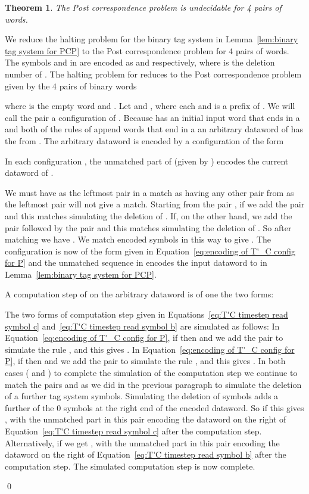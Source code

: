\documentclass[11pt]{article} \usepackage{amsfonts,amsmath,amssymb,amsthm}
\renewenvironment{proof}{{\bfseries\noindent Proof.}}{\qed\vspace{3.5ex}}
\newtheorem{theorem}{Theorem}
\begin{document}
\begin{theorem}\label{thm:PCP 4 is undecidable}
The Post correspondence problem is undecidable for 4 pairs of words. 
\end{theorem}
\begin{proof}
We reduce the halting problem for the binary tag system  in Lemma~\ref{lem:binary tag system for PCP} to the Post correspondence problem for 4 pairs of words. 
The symbols  and  in  are encoded as  and  respectively, where  is the deletion number of . 
The halting problem for  reduces to the Post correspondence problem given by the 4 pairs of binary words

where  is the empty word and . 
Let  and , where each  and  is a prefix of . 
We will call the pair  a configuration of . Because  has an initial input word that ends in a  and both of the rules of  append words that end in a  an arbitrary dataword of  has the from . The arbitrary dataword  is encoded by a  configuration of the form

In each configuration , the unmatched part of  (given by ) encodes the current dataword of . 


We must have  as the leftmost pair  in a match as having any other pair from  as the leftmost pair will not give a match. 
Starting from the pair , if  we add the pair  and this matches  simulating the deletion of . 
If, on the other hand,  we add the pair  followed by the pair  and this matches  simulating the deletion of . 
So after matching  we have .
We match  encoded  symbols in this way to give . 
The configuration is now of the form given in Equation~\eqref{eq:encoding of T'_C config for P} and the unmatched sequence  in  encodes the input dataword to  in Lemma~\ref{lem:binary tag system for PCP}. 


A computation step of  on the arbitrary dataword  is of one the two forms:



The two forms of computation step given in Equations~\eqref{eq:T'C timestep read symbol c} and~\eqref{eq:T'C timestep read symbol b} are simulated as follows: In Equation~\eqref{eq:encoding of T'_C config for P}, if  then  and we add the pair  to simulate the  rule ,  and this gives .
In Equation~\eqref{eq:encoding of T'_C config for P}, if  then  and we add the pair  to simulate the  rule , and this gives .
In both cases ( and ) to complete the simulation of the computation step we continue to match the pairs  and  as we did in the previous paragraph to simulate the deletion of a further  tag system symbols. 
Simulating the deletion of  symbols adds a further  of the 0 symbols at the right end of the encoded dataword. 
So if  this gives , with the unmatched part in this pair encoding the dataword on the right of Equation~\eqref{eq:T'C timestep read symbol c} after the computation step. 
Alternatively, if  we get , with the unmatched part in this pair encoding the dataword on the right of Equation~\eqref{eq:T'C timestep read symbol b} after the computation step.
The simulated computation step is now complete.


\end{proof}
\end{document}
